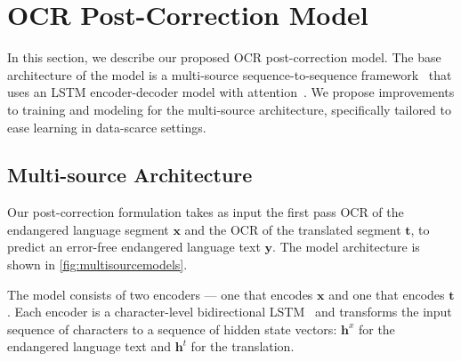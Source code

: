 \section{OCR Post-Correction Model}
\label{sec:model}
In this section, we describe our proposed OCR post-correction model. The base architecture of the model is a multi-source sequence-to-sequence framework~\cite{zoph-knight-2016-multi,libovicky-helcl-2017-attention} that uses an LSTM encoder-decoder model with attention~\cite{bahdanau2015neural}. We propose improvements to training and modeling for the multi-source architecture, specifically tailored to ease learning in data-scarce settings.

\subsection{Multi-source Architecture}
\label{sec:base}

Our post-correction formulation takes as input the first pass OCR of the endangered language segment $\boldsymbol{x}$ and the OCR of the translated segment $\boldsymbol{t}$, to predict an error-free endangered language text $\boldsymbol{y}$. The model architecture is shown in \autoref{fig:multisourcemodels}.

The model consists of two encoders --- one that encodes $\boldsymbol{x}$ and one that encodes $\boldsymbol{t}$. Each encoder is a character-level bidirectional LSTM~\cite{hochreiter1997long} and transforms the input sequence of characters to a sequence of hidden state vectors: $\mathbf{h}^x$ for the endangered language text and $\mathbf{h}^t$ for the translation.

